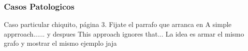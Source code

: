 \subsubsection{Casos Patologicos}
Caso particular chiquito, página 3. Fijate el parrafo que arranca en A simple apprroach...... y despues This approach ignores that... La idea es armar el mismo grafo y mostrar el mismo ejemplo jaja